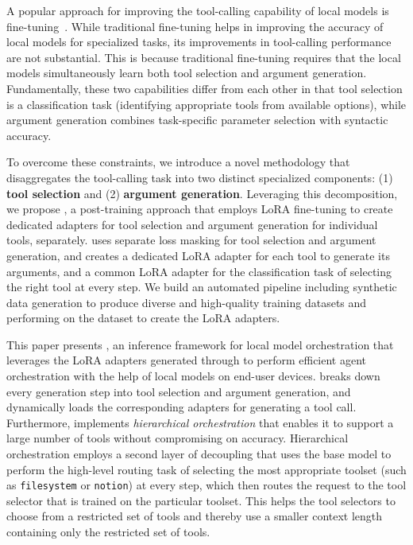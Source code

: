 A popular approach for improving the tool-calling capability of local models is fine-tuning~\cite{erdogan2024tinyagent,lin2024hammer,liu2024toolace}. While traditional fine-tuning helps in improving the accuracy of local models for specialized tasks, its improvements in tool-calling performance are not substantial. This is because traditional fine-tuning requires that the local models simultaneously learn both tool selection and argument generation. Fundamentally, these two capabilities differ from each other in that tool selection is a classification task (identifying appropriate tools from available options), while argument generation combines task-specific parameter selection with syntactic accuracy.

To overcome these constraints, we introduce a novel methodology that disaggregates the tool-calling task into two distinct specialized components: (1) \textbf{tool selection} and (2) \textbf{argument generation}. Leveraging this decomposition, we propose \textbf{\decoupled}, a post-training approach that employs LoRA fine-tuning \cite{hu2022lora} to create dedicated adapters for tool selection and argument generation for individual tools, separately. \Decoupled{} uses separate loss masking for tool selection and argument generation, and creates a dedicated LoRA adapter for each tool to generate its arguments, and a common LoRA adapter for the classification task of selecting the right tool at every step. We build an automated pipeline including synthetic data generation to produce diverse and high-quality training datasets and performing \decoupled{} on the dataset to create the LoRA adapters.

This paper presents \sys{}, an inference framework for local model orchestration that leverages the LoRA adapters generated through \decoupled{} to perform efficient agent orchestration with the help of local models on end-user devices. \sys{} breaks down every generation step into tool selection and argument generation, and dynamically loads the corresponding adapters for generating a tool call. Furthermore, \sys{} implements \emph{hierarchical orchestration} that enables it to support a large number of tools without compromising on accuracy. Hierarchical orchestration employs a second layer of decoupling that uses the base model to perform the high-level routing task of selecting the most appropriate toolset (such as \texttt{filesystem} or \texttt{notion}) at every step, which then routes the request to the tool selector that is trained on the particular toolset. This helps the tool selectors to choose from a restricted set of tools and thereby use a smaller context length containing only the restricted set of tools. 

